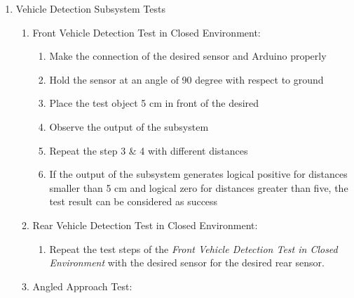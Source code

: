 \documentclass[a4paper,12pt]{article}
\begin{document}
\begin{enumerate}
\begin{enumerate}
\begin{enumerate}
\end{enumerate}

\end{enumerate}



\item {Vehicle Detection Subsystem Tests}\label{sect:vhd}


\begin{enumerate}


\item Front Vehicle Detection Test in Closed Environment:

\begin{enumerate}

\item Make the connection of the desired sensor and Arduino properly  

\item Hold the sensor at an angle of 90 degree with respect to ground  

\item Place the test object 5 cm in front of the desired  

\item Observe the output of the subsystem  

\item Repeat the step 3 \& 4 with different distances  

\item If the output of the subsystem generates logical positive for distances smaller than 5 cm and logical zero for distances greater than five, the test result can be considered as success  

\end{enumerate}					


\item Rear Vehicle Detection Test in Closed Environment:		

\begin{enumerate}

\item Repeat the test steps of the \textit{Front Vehicle Detection Test in Closed Environment} with the desired sensor for the desired rear sensor.   

\end{enumerate}


\item {Angled Approach Test:}

\begin{enumerate}


\end{enumerate}
\end{enumerate}
\end{enumerate}
\end{document}
